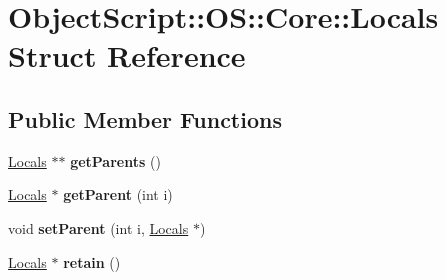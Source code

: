 \hypertarget{struct_object_script_1_1_o_s_1_1_core_1_1_locals}{}\section{Object\+Script\+:\+:OS\+:\+:Core\+:\+:Locals Struct Reference}
\label{struct_object_script_1_1_o_s_1_1_core_1_1_locals}
\subsection*{Public Member Functions}
\begin{DoxyCompactItemize}
\item 
\hyperlink{struct_object_script_1_1_o_s_1_1_core_1_1_locals}{Locals} $\ast$$\ast$ {\bfseries get\+Parents} ()\hypertarget{struct_object_script_1_1_o_s_1_1_core_1_1_locals_a75b21051207242e4c0e7cd311dcdeecf}{}\label{struct_object_script_1_1_o_s_1_1_core_1_1_locals_a75b21051207242e4c0e7cd311dcdeecf}

\item 
\hyperlink{struct_object_script_1_1_o_s_1_1_core_1_1_locals}{Locals} $\ast$ {\bfseries get\+Parent} (int i)\hypertarget{struct_object_script_1_1_o_s_1_1_core_1_1_locals_a7fb2ce8337b79a9b6e5c6be8d1fd81cf}{}\label{struct_object_script_1_1_o_s_1_1_core_1_1_locals_a7fb2ce8337b79a9b6e5c6be8d1fd81cf}

\item 
void {\bfseries set\+Parent} (int i, \hyperlink{struct_object_script_1_1_o_s_1_1_core_1_1_locals}{Locals} $\ast$)\hypertarget{struct_object_script_1_1_o_s_1_1_core_1_1_locals_a0666c0c542c5bc428430bd148435e73f}{}\label{struct_object_script_1_1_o_s_1_1_core_1_1_locals_a0666c0c542c5bc428430bd148435e73f}

\item 
\hyperlink{struct_object_script_1_1_o_s_1_1_core_1_1_locals}{Locals} $\ast$ {\bfseries retain} ()\hypertarget{struct_object_script_1_1_o_s_1_1_core_1_1_locals_af2414492f08e4a39e56f9c90d62e7443}{}\label{struct_object_script_1_1_o_s_1_1_core_1_1_locals_af2414492f08e4a39e56f9c90d62e7443}

\end{DoxyCompactItemize}
